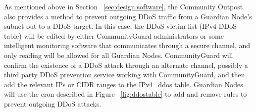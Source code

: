 As mentioned above in Section ~\ref{sec:design:software}, the Community Outpost also provides a method to prevent outgoing DDoS traffic from a Guardian Node's subnet out to a DDoS target. In this case, the DDoS victim list (IPv4 DDoS table) will be edited by either CommunityGuard administrators or some intelligent monitoring software that communicates through a secure channel, and only reading will be allowed for all Guardian Nodes. CommunityGuard will confirm the existence of a DDoS attack through an alternate channel, possibly a third party DDoS prevention service \cite{DDoSPreventionTools} working with CommunityGuard, and then add the relevant IPs or CIDR ranges to the IPv4_ddos table. Guardian Nodes will use the cron described in Figure ~\ref{fig:ddostable} to add and remove rules to prevent outgoing DDoS attacks.
